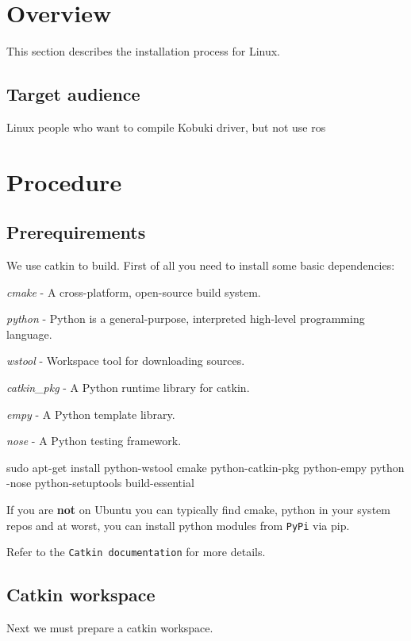 \section{\-Overview}\label{koMainPage_Overview}
\-This section describes the installation process for \-Linux.\subsection{\-Target audience}\label{enMainPage_who}
\-Linux people who want to compile \-Kobuki driver, but not use ros\section{\-Procedure}\label{enInstallationLinuxGuide_Procedure}
\subsection{\-Prerequirements}\label{enInstallationLinuxGuide_prereq}
\-We use catkin to build. \-First of all you need to install some basic dependencies\-:


\begin{DoxyItemize}
\item {\itshape cmake\/} -\/ \-A cross-\/platform, open-\/source build system.
\item {\itshape python\/} -\/ \-Python is a general-\/purpose, interpreted high-\/level programming language.
\item {\itshape wstool\/} -\/ \-Workspace tool for downloading sources.
\item {\itshape catkin\-\_\-pkg\/} -\/ \-A \-Python runtime library for catkin.
\item {\itshape empy\/} -\/ \-A \-Python template library.
\item {\itshape nose\/} -\/ \-A \-Python testing framework.
\end{DoxyItemize}


\begin{DoxyCode}
  sudo apt-get install python-wstool cmake python-catkin-pkg python-empy python
      -nose python-setuptools build-essential
\end{DoxyCode}


\-If you are {\bfseries not} on \-Ubuntu you can typically find cmake, python in your system repos and at worst, you can install python modules from {\tt \-Py\-Pi} via pip.

\-Refer to the {\tt \-Catkin documentation} for more details.\subsection{\-Catkin workspace}\label{enInstallationLinuxGuide_catkin}
\-Next we must prepare a catkin workspace.


